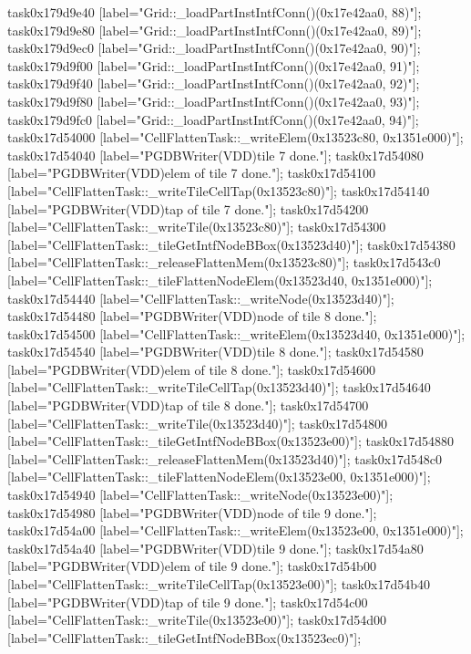 {	task0x179d9e40 [label="Grid::_loadPartInstIntfConn()(0x17e42aa0, 88)"];
	task0x179d9e80 [label="Grid::_loadPartInstIntfConn()(0x17e42aa0, 89)"];
	task0x179d9ec0 [label="Grid::_loadPartInstIntfConn()(0x17e42aa0, 90)"];
	task0x179d9f00 [label="Grid::_loadPartInstIntfConn()(0x17e42aa0, 91)"];
	task0x179d9f40 [label="Grid::_loadPartInstIntfConn()(0x17e42aa0, 92)"];
	task0x179d9f80 [label="Grid::_loadPartInstIntfConn()(0x17e42aa0, 93)"];
	task0x179d9fc0 [label="Grid::_loadPartInstIntfConn()(0x17e42aa0, 94)"];
	task0x17d54000 [label="CellFlattenTask::_writeElem(0x13523c80, 0x1351e000)"];
	task0x17d54040 [label="PGDBWriter(VDD)\nCell tile 7 done."];
	task0x17d54080 [label="PGDBWriter(VDD)\nCell elem of tile 7 done."];
	task0x17d54100 [label="CellFlattenTask::_writeTileCellTap(0x13523c80)"];
	task0x17d54140 [label="PGDBWriter(VDD)\nCell tap of tile 7 done."];
	task0x17d54200 [label="CellFlattenTask::_writeTile(0x13523c80)"];
	task0x17d54300 [label="CellFlattenTask::_tileGetIntfNodeBBox(0x13523d40)"];
	task0x17d54380 [label="CellFlattenTask::_releaseFlattenMem(0x13523c80)"];
	task0x17d543c0 [label="CellFlattenTask::_tileFlattenNodeElem(0x13523d40, 0x1351e000)"];
	task0x17d54440 [label="CellFlattenTask::_writeNode(0x13523d40)"];
	task0x17d54480 [label="PGDBWriter(VDD)\nCell node of tile 8 done."];
	task0x17d54500 [label="CellFlattenTask::_writeElem(0x13523d40, 0x1351e000)"];
	task0x17d54540 [label="PGDBWriter(VDD)\nCell tile 8 done."];
	task0x17d54580 [label="PGDBWriter(VDD)\nCell elem of tile 8 done."];
	task0x17d54600 [label="CellFlattenTask::_writeTileCellTap(0x13523d40)"];
	task0x17d54640 [label="PGDBWriter(VDD)\nCell tap of tile 8 done."];
	task0x17d54700 [label="CellFlattenTask::_writeTile(0x13523d40)"];
	task0x17d54800 [label="CellFlattenTask::_tileGetIntfNodeBBox(0x13523e00)"];
	task0x17d54880 [label="CellFlattenTask::_releaseFlattenMem(0x13523d40)"];
	task0x17d548c0 [label="CellFlattenTask::_tileFlattenNodeElem(0x13523e00, 0x1351e000)"];
	task0x17d54940 [label="CellFlattenTask::_writeNode(0x13523e00)"];
	task0x17d54980 [label="PGDBWriter(VDD)\nCell node of tile 9 done."];
	task0x17d54a00 [label="CellFlattenTask::_writeElem(0x13523e00, 0x1351e000)"];
	task0x17d54a40 [label="PGDBWriter(VDD)\nCell tile 9 done."];
	task0x17d54a80 [label="PGDBWriter(VDD)\nCell elem of tile 9 done."];
	task0x17d54b00 [label="CellFlattenTask::_writeTileCellTap(0x13523e00)"];
	task0x17d54b40 [label="PGDBWriter(VDD)\nCell tap of tile 9 done."];
	task0x17d54c00 [label="CellFlattenTask::_writeTile(0x13523e00)"];
	task0x17d54d00 [label="CellFlattenTask::_tileGetIntfNodeBBox(0x13523ec0)"];
}
